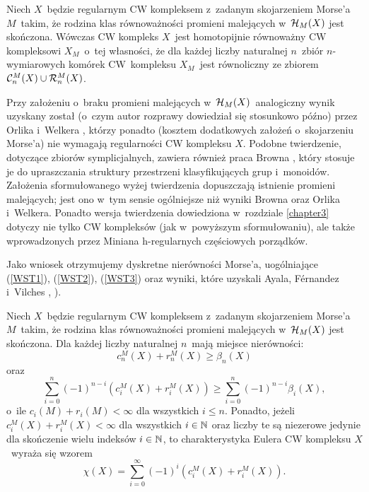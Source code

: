\begin{tw*}[\ref{maincor2}]
Niech $X$~będzie regularnym CW kompleksem z~zadanym skojarzeniem Morse'a $M$~takim, że rodzina klas równoważności promieni malejących w~$\mathcal{H}_M(X)$ jest skończona. Wówczas CW kompleks $X$~jest homotopijnie równoważny CW kompleksowi $X_M$~o~tej własności, że dla każdej liczby naturalnej $n$~zbiór $n$-wymiarowych komórek CW~kompleksu $X_M$~jest równoliczny ze zbiorem $\mathcal{C}_n^M(X)\cup \mathcal{R}_n^M(X)$.
\end{tw*}

Przy założeniu o~braku promieni malejących w~$\mathcal{H}_M(X)$~analogiczny wynik uzyskany został (o~czym autor rozprawy dowiedział się stosunkowo późno) przez Orlika i~Welkera \cite[Theorem 4.2.14]{Orlik07}, którzy ponadto (kosztem dodatkowych założeń o~skojarzeniu Morse'a) nie wymagają regularności CW kompleksu $X$. Podobne twierdzenie, dotyczące zbiorów symplicjalnych, zawiera również praca Browna \cite[Proposition 1]{Brown92}, który stosuje je do upraszczania struktury przestrzeni klasyfikujących grup i~monoidów. Założenia sformułowanego wyżej twierdzenia dopuszczają istnienie promieni malejących; jest ono w~tym sensie ogólniejsze niż wyniki Browna oraz Orlika i~Welkera. Ponadto wersja twierdzenia dowiedziona w~rozdziale \ref{chapter3} dotyczy nie tylko CW kompleksów (jak w~powyższym sformułowaniu), ale także wprowadzonych przez Miniana \cite{Minian12} \mbox{h-regularnych} częściowych porządków.

Jako wniosek otrzymujemy dyskretne nierówności Morse'a, uogólniające  (\ref{WST1}), (\ref{WST2}), (\ref{WST3}) oraz wyniki, które uzyskali Ayala, F{\'e}rnandez i~Vilches \cite[Theorem 3.8]{Ayala07}, \cite[Theorem 3.1]{Ayala09}). 

\begin{stw*}[\ref{morse-ineq}]
Niech $X$~będzie regularnym CW kompleksem z~zadanym skojarzeniem Morse'a $M$~takim, że rodzina klas równoważności promieni malejących w~$\mathcal{H}_M(X)$ jest skończona. Dla każdej liczby naturalnej $n$~mają miejsce nierówności:
\[c^M_n(X)+r^M_n(X)\geq \beta_n(X)\]
oraz
\[\sum_{i=0}^{n}(-1)^{n-i}\left(c^M_i(X)+r^M_i(X)\right)\geq \sum_{i=0}^{n}(-1)^{n-i}\beta_i(X),\] o~ile $c_i(M)+r_i(M)<\infty$ dla wszystkich $i\leq n$. 
Ponadto, jeżeli $c^M_i(X)+r^M_i(X)<\infty$ dla wszystkich $i\in\mathbb{N}$ oraz liczby te są niezerowe jedynie dla skończenie wielu indeksów $i\in\mathbb{N}$, to charakterystyka Eulera CW kompleksu $X$~wyraża się wzorem \[\chi(X)=\sum_{i=0}^{\infty}(-1)^i \left(c^M_i(X)+r^M_i(X)\right).\]
\end{stw*}

